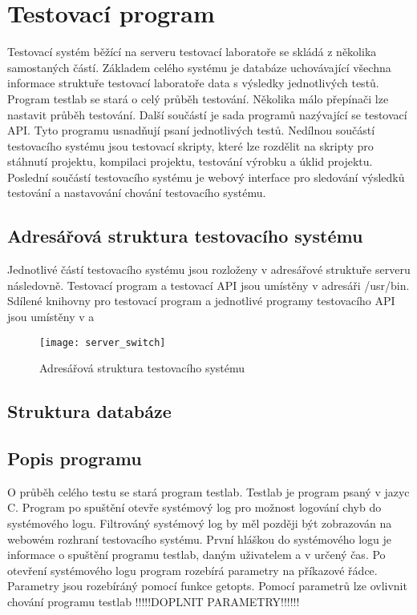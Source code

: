 \chapter{Testovací program}
Testovací systém běžící na serveru testovací laboratoře se skládá z několika samostaných částí. Základem celého systému je databáze uchovávající všechna informace struktuře testovací laboratoře data s výsledky jednotlivých testů. Program testlab se stará o celý průběh testování. Několika málo přepínači lze nastavit průběh testování. Další součástí je sada programů nazývající se testovací API. Tyto programu usnadňují psaní jednotlivých testů. Nedílnou součástí testovacího systému jsou testovací skripty, které lze rozdělit na skripty pro stáhnutí projektu, kompilaci projektu, testování výrobku a úklid projektu. Poslední součástí testovacího systému je webový interface pro sledování výsledků testování a nastavování chování testovacího systému.

\section{Adresářová struktura testovacího systému}

Jednotlivé částí testovacího systému jsou rozloženy v adresářové struktuře serveru následovně. Testovací program a testovací API jsou umístěny v adresáři /usr/bin. Sdílené knihovny pro testovací program a jednotlivé programy testovacího API jsou umístěny v a

\begin{figure}[h]
  \centering
  \texttt{[image: server\_switch]}
  \caption{Adresářová struktura testovacího systému}
  \label{fig:server_switch}
\end{figure}

\section{Struktura databáze}

\section{Popis programu}

O průběh celého testu se stará program testlab. Testlab je program psaný v jazyc C. Program po spuštění otevře systémový log pro možnost logování chyb do systémového logu. Filtrováný systémový log by měl později být zobrazován na webowém rozhraní testovacího systému. První hláškou do systémového logu je informace o spuštění programu testlab, daným uživatelem a v určený čas. Po otevření systémového logu program rozebírá parametry na příkazové řádce. Parametry jsou rozebíráný pomocí funkce getopts. Pomocí parametrů lze ovlivnit chování programu testlab !!!!!DOPLNIT PARAMETRY!!!!!!


